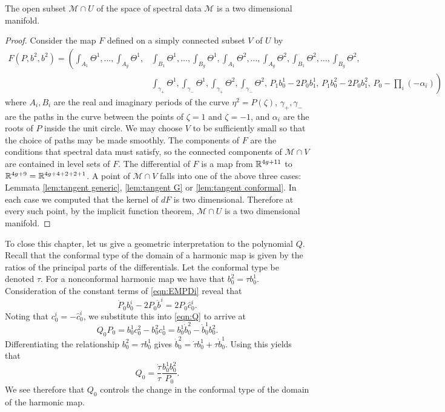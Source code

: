 \begin{thm}
The open subset $\mathcal{M} \cap U$ of the space of spectral data $\mathcal{M}$ is a two dimensional manifold.

\begin{proof}
Consider the map $F$ defined on a simply connected subset $V$ of $U$ by
\begin{align*}
F(P,b^2,b^2)
= \left( \int_{A_1} Θ^1, \dots, \int_{A_g} Θ^1, \right.& \int_{B_1} Θ^1, \dots, \int_{B_g} Θ^1, \int_{A_1} Θ^2, \dots, \int_{A_g} Θ^2, \int_{B_1} Θ^2, \dots, \int_{B_g} Θ^2, \\
&\left. \int_{γ_+} Θ^1, \int_{γ_-} Θ^1, \int_{γ_+} Θ^2, \int_{γ_-} Θ^2,\, P_1b^1_0 - 2P_0b^1_1,\, P_1b^2_0 - 2P_0b^2_1,\, P_0 - \prod_{i}(-α_i) \right)
\end{align*}
where $A_i, B_i$ are the real and imaginary periods of the curve $η^2 = P(ζ)$, $γ_+,γ_-$ are the paths in the curve between the points of $ζ=1$ and $ζ=-1$, and $α_i$ are the roots of $P$ inside the unit circle. We may choose $V$ to be sufficiently small so that the choice of paths may be made smoothly. The components of $F$ are the conditions that spectral data must satisfy, so the connected components of $\mathcal{M}\cap V$ are contained in level sets of $F$. The differential of $F$ is a map from $\mathbb{R}^{4g+11}$ to $\mathbb{R}^{4g+9} = \mathbb{R}^{4g+4+2+2+1}$. A point of $\mathcal{M}\cap V$ falls into one of the above three cases: Lemmata \ref{lem:tangent generic}, \ref{lem:tangent G} or \ref{lem:tangent conformal}. In each case we computed that the kernel of $dF$ is two dimensional. Therefore at every such point, by the implicit function theorem, $\mathcal{M}\cap U$ is a two dimensional manifold.
\end{proof}
\end{thm}

To close this chapter, let us give a geometric interpretation to the polynomial $Q$. Recall that the conformal type of the domain of a harmonic map is given by the ratios of the principal parts of the differentials. Let the conformal type be denoted $τ$. For a nonconformal harmonic map we have that $b^2_0 = τ b^1_0$. Consideration of the constant terms of \eqref{eqn:EMPDi} reveal that
\[
\dot{P}_0b^i_0 -2P_0 \dot{b}^i = 2P_0\hat{c}^i_0.
\]
Noting that $c^i_0 = - \hat{c}^i_0$, we substitute this into \eqref{eqn:Q} to arrive at
\[
Q_0 P_0 = b^1_0 c^2_0 - b^2_0 c^1_0 = b^1_0 \dot{b}^2_0 - \dot{b}^1_0 b^2_0.
\]
Differentiating the relationship $b^2_0 = τ b^1_0$ gives $\dot{b}^2_0 = \dot{τ} b^1_0 + τ \dot{b}^1_0$. Using this yields that
\[
Q_0 = \frac{\dot{τ}}{τ} \frac{b^1_0 b^2_0}{P_0}.
\]
We see therefore that $Q_0$ controls the change in the conformal type of the domain of the harmonic map.
